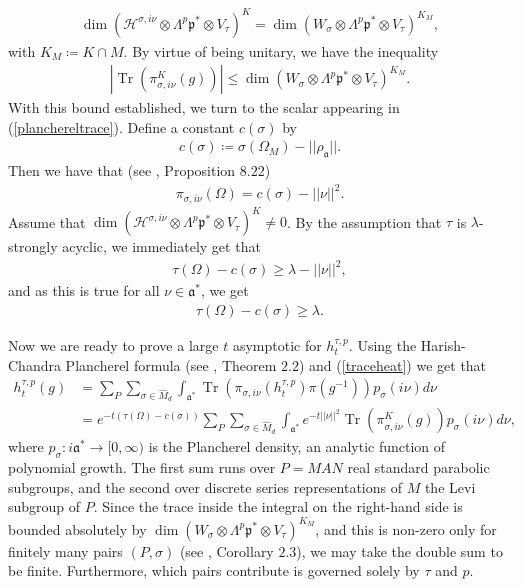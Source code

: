\documentclass[11pt,reqno]{amsart}
\numberwithin{equation}{section}
\theoremstyle{definition}
\theoremstyle{remark}
\newcommand{\Tr}{\operatorname{Tr}}
\renewcommand{\dim}{\operatorname{dim}}
\newcommand{\mf}[1]{\mathfrak{#1}}
\begin{document}
\begin{align*}
    \dim(\mathcal{H}^{\sigma,i\nu}\otimes \Lambda^p\mf{p}^*\otimes V_\tau)^K = \dim(W_\sigma\otimes \Lambda^p\mf{p}^*\otimes V_\tau)^{K_M},
\end{align*}
with $K_M\coloneqq K\cap M$. By virtue of being unitary, we have the inequality
\begin{align}\label{dimupper}
    |\Tr(\pi_{\sigma,i\nu}^K(g))|\leq \dim(W_\sigma\otimes \Lambda^p\mf{p}^*\otimes V_\tau)^{K_M}.
\end{align}
With this bound established, we turn to the scalar appearing in (\ref{planchereltrace}). Define a constant $c(\sigma)$ by
\begin{align*}
    c(\sigma) \coloneqq \sigma(\Omega_M)-||\rho_{\mf{a}}||.
\end{align*}
Then we have that (see \cite{Knapp}, Proposition $8.22$)
\begin{align*}
    \pi_{\sigma,i\nu}(\Omega) = c(\sigma)-||\nu||^2.
\end{align*}
Assume that $\dim(\mathcal{H}^{\sigma,i\nu}\otimes \Lambda^p\mf{p}^*\otimes V_\tau)^K\neq 0$. By the assumption that $\tau$ is $\lambda$-strongly acyclic, we immediately get that
\begin{align*}
    \tau(\Omega)-c(\sigma)\geq \lambda-||\nu||^2,
\end{align*}
and as this is true for all $\nu\in\mf{a}^*$, we get
\begin{align}\label{gap}
    \tau(\Omega)-c(\sigma)\geq \lambda.
\end{align}

\noindent Now we are ready to prove a large $t$ asymptotic for $h_t^{\tau,p}$. Using the Harish-Chandra Plancherel formula (see \cite{Olbrich}, Theorem $2.2$) and (\ref{traceheat}) we get that
\begin{align*}
    h_t^{\tau,p}(g) &= \sum_P\sum_{\sigma\in \hat{M}_d}\int_{\mf{a}^*}\Tr(\pi_{\sigma,i\nu}(h_t^{\tau,p})\pi(g^{-1}))p_\sigma(i\nu) d\nu \\
    &=e^{-t(\tau(\Omega)-c(\sigma))}\sum_P\sum_{\sigma\in \hat{M}_d}\int_{\mf{a}^*} e^{-t||\nu||^2}\Tr(\pi_{\sigma,i\nu}^K(g))p_\sigma(i\nu) d\nu,
\end{align*}
where $p_\sigma:i\mf{a}^*\to [0,\infty)$ is the Plancherel density, an analytic function of polynomial growth. The first sum runs over $P=MAN$ real standard parabolic subgroups, and the second over discrete series representations of $M$ the Levi subgroup of $P$. Since the trace inside the integral on the right-hand side is bounded absolutely by $\dim(W_\sigma\otimes \Lambda^p\mf{p}^*\otimes V_\tau)^{K_M}$, and this is non-zero only for finitely many pairs $(P,\sigma)$ (see \cite{Olbrich}, Corollary $2.3$), we may take the double sum to be finite. Furthermore, which pairs contribute is governed solely by $\tau$ and $p$. 
\end{document}
